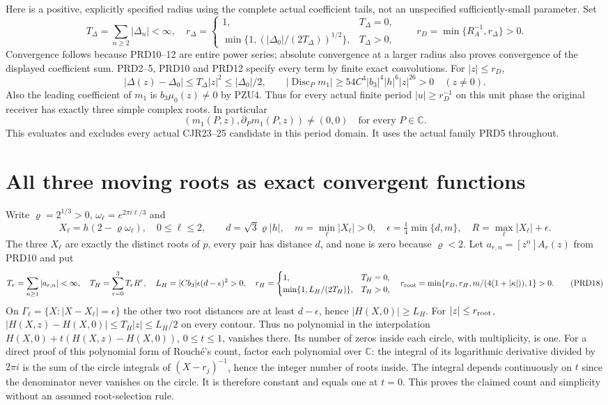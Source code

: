 \documentclass[11pt]{article}
\newcommand{\C}{\mathbb C}
\begin{document}
Here is a positive, explicitly specified radius using the complete
actual coefficient tails, not an unspecified sufficiently-small
parameter. Set
\[
 T_\Delta=\sum_{n\ge2}|\Delta_n|<\infty,\quad
 r_\Delta=\begin{cases}
 1,&T_\Delta=0,\\
 \min\{1,(|\Delta_0|/(2T_\Delta))^{1/2}\},&T_\Delta>0,
 \end{cases}
 \qquad r_D=\min\{R_A^{-1},r_\Delta\}>0.
 \tag{PRD14}
\]
Convergence follows because PRD10--12 are entire power series;
absolute convergence at a larger radius also proves convergence
of the displayed coefficient sum. PRD2--5, PRD10 and PRD12
specify every term by finite exact convolutions. For $|z|\le r_D$,
\[
 |\Delta(z)-\Delta_0|\le T_\Delta|z|^2
       \le|\Delta_0|/2,
 \qquad
 |\operatorname{Disc}_Pm_1|\ge54C^4|b_3|^4|h|^6|z|^{26}>0
 \quad(z\ne0).
 \tag{PRD15}
\]
Also the leading coefficient of $m_1$ is $b_3\mu_0(z)\ne0$
by PZU4. Thus for every actual finite period $|u|\ge r_D^{-1}$
on this unit phase the original receiver has exactly three simple
complex roots. In particular
\[
 (m_1(P,z),\partial_Pm_1(P,z))\ne(0,0)
              \quad\text{for every }P\in\C.
 \tag{PRD16}
\]
This evaluates and excludes every actual CJR23--25 candidate in
this period domain. It uses the actual family PRD5 throughout.

\section{All three moving roots as exact convergent functions}
Write $\varrho=2^{1/3}>0$, $\omega_\ell=e^{2\pi i\ell/3}$ and
\[
 X_\ell=h(2-\varrho\omega_\ell),\quad 0\le\ell\le2,
 \qquad d=\sqrt3\varrho|h|,
 \quad m=\min_\ell|X_\ell|>0,
 \quad \epsilon=\tfrac14\min\{d,m\},
 \quad R=\max_\ell|X_\ell|+\epsilon.
 \tag{PRD17}
\]
The three $X_\ell$ are exactly the distinct roots of $p$, every
pair has distance $d$, and none is zero because $\varrho<2$.
Let $a_{r,n}=[z^n]A_r(z)$ from PRD10 and put
\[
 T_r=\sum_{n\ge1}|a_{r,n}|<\infty,\quad
 T_H=\sum_{r=0}^3T_rR^r,\quad
 L_H=|Cb_3|\epsilon(d-\epsilon)^2>0,
 \quad
 r_H=\begin{cases}1,&T_H=0,\\
 \min\{1,L_H/(2T_H)\},&T_H>0,
 \end{cases}
 \quad r_{\rm root}=\min\{r_D,r_H,m/(4(1+|\kappa|)),1\}>0.
 \tag{PRD18}
\]
On $\Gamma_\ell=\{X:|X-X_\ell|=\epsilon\}$ the other two
root distances are at least $d-\epsilon$, hence
$|H(X,0)|\ge L_H$. For $|z|\le r_{\rm root}$,
$|H(X,z)-H(X,0)|\le T_H|z|\le L_H/2$ on every contour.
Thus no polynomial in the interpolation
$H(X,0)+t(H(X,z)-H(X,0))$, $0\le t\le1$, vanishes there.
Its number of zeros inside each circle, with multiplicity, is one.
For a direct proof of this polynomial form of Rouch\'e's count,
factor each polynomial over $\C$: the integral of its logarithmic
derivative divided by $2\pi i$ is the sum of the circle integrals
of $(X-r_j)^{-1}$, hence the integer number of roots inside.
The integral depends continuously on $t$ since the denominator
never vanishes on the circle. It is therefore constant and equals
one at $t=0$. This proves the claimed count and simplicity without
an assumed root-selection rule.
\end{document}

